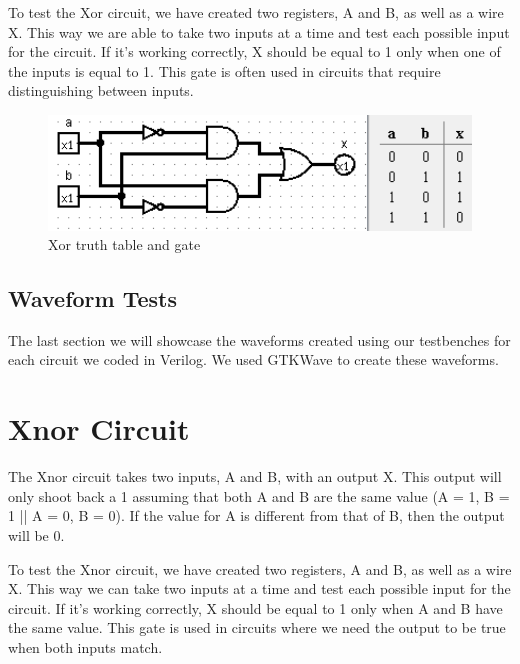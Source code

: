 \documentclass[12pt]{article}
\begin{document}
To test the Xor circuit, we have created two registers, A and B, as well as a wire X. This way we are able to take two inputs at a time and test each possible input for the circuit. If it's working correctly, X should be equal to 1 only when one of the inputs is equal to 1. This gate is often used in circuits that require distinguishing between inputs.


\begin{figure}[h]
    \centering
    \includegraphics[width = 1.0\textwidth]{figs/xor.png}
    \caption{Xor truth table and gate}
    \label{fig:enter-label}
\end{figure}


\subsection{Waveform Tests}

The last section we will showcase the waveforms created using our testbenches for each circuit we coded in Verilog. We used GTKWave to create these waveforms.







\section{Xnor Circuit}
The Xnor circuit takes two inputs, A and B, with an output X. This output will only shoot back a 1 assuming that both A and B are the same value (A = 1, B = 1 || A = 0, B = 0). If the value for A is different from that of B, then the output will be 0.


To test the Xnor circuit, we have created two registers, A and B, as well as a wire X. This way we can take two inputs at a time and test each possible input for the circuit. If it's working correctly, X should be equal to 1 only when A and B have the same value. This gate is used in circuits where we need the output to be true when both inputs match.

\end{document}

